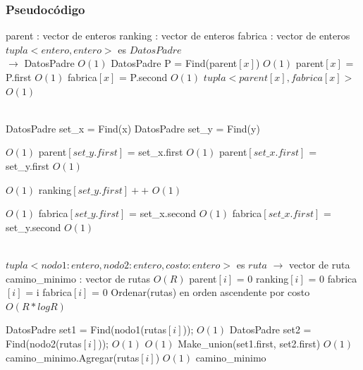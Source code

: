 \documentclass[a4paper, 10pt, twoside]{article}
\newenvironment{pseudo}[1][]{%
    \vspace{0.5em}%
    \begin{algorithmic}%
}
{%
    \end{algorithmic}%
    \vspace{0.5em}%
}
\newcommand{\Ode}[1]{\hfill $O(#1)$}
\begin{document}
\subsubsection{Pseudocódigo}
\begin{pseudo}

\State parent : vector de enteros
\State ranking : vector de enteros
\State fabrica : vector de enteros
\State $tupla <entero, entero>$ es $DatosPadre$
\\
 $\rightarrow$ DatosPadre
												\Ode{1}
		\State DatosPadre P = Find(parent$[x]$)					\Ode{1}
    	\State parent$[x]$ = P.first							\Ode{1}
	    \State fabrica$[x]$ = P.second							\Ode{1}
    \EndIf
    \Return $tupla <parent[x], fabrica[x]>$						\Ode{1}
\EndProcedure

\\
    \State DatosPadre set\_x = Find(x)
    \State DatosPadre set\_y = Find(y)
    
    		\Ode{1}
        \State parent$[set\_y.first]$ = set\_x.first			\Ode{1}
    \Else
        \State parent$[set\_x.first]$ = set\_y.first			\Ode{1}
    \EndIf
    
    		\Ode{1}
        \State ranking$[set\_y.first]++$						\Ode{1}
	\EndIf

    									\Ode{1}
    	\State fabrica$[set\_y.first]$ = set\_x.second			\Ode{1}
    \Else
    	\State fabrica$[set\_x.first]$ = set\_y.second			\Ode{1}
    \EndIf
\EndProcedure

\\

\State $tupla <nodo1 : entero, nodo2 : entero, costo : entero>$ es $ruta$
 $\rightarrow$ vector de ruta
	\State camino\_minimo : vector de rutas						\Ode{R}
	 parent$[i]$ = 0 \EndFor
	 ranking$[i]$ = 0 \EndFor
	 fabrica$[i]$ = i \EndFor
	 fabrica$[i]$ = 0 \EndFor
	\State Ordenar(rutas) en orden ascendente por costo			\Ode{R * log R}	
	
		\State DatosPadre set1 = Find(nodo1(rutas$[i]$));		\Ode{1}
        \State DatosPadre set2 = Find(nodo2(rutas$[i]$));		\Ode{1}
	     \Ode{1}
	    	\State Make\_union(set1.first, set2.first)			\Ode{1}
	    	\State camino\_minimo.Agregar(rutas$[i]$)			\Ode{1}
	    \EndIf
	\EndFor
	\Return camino\_minimo
\EndProcedure

\end{pseudo}
\end{document}
